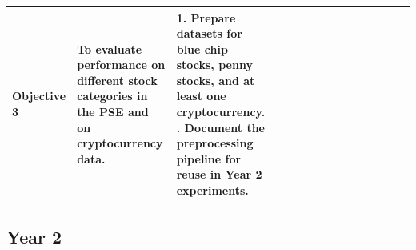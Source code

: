 \documentclass[12pt,a4paper]{article}
\begin{document}
\begin{table}[H]
\begin{tabular}{|p{2.4cm}|p{3.3cm}|p{3.9cm}|*{12}{c|}}
		Objective 3 &
		To evaluate performance on different stock categories in the PSE and on cryptocurrency data. &
		1. Prepare datasets for blue chip stocks, penny stocks, and at least one cryptocurrency. 
		\newline
		2. Document the preprocessing pipeline for reuse in Year 2 experiments. &
		 & & & & & & & & & &\cellcolor{gray!50} &\cellcolor{gray!50}\\
		\hline
		
	\end{tabular}
\end{table}



\subsection{Year 2}
\end{document}
